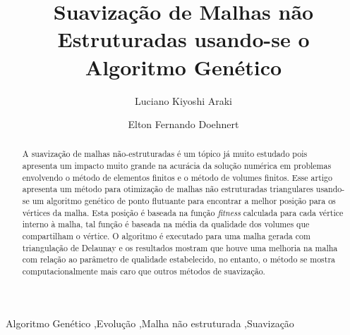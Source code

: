 \documentclass[review]{elsarticle}
\begin{document}
\begin{frontmatter}

\title{Suavização de Malhas não Estruturadas usando-se o Algoritmo Genético}

\author{Luciano Kiyoshi Araki}
\author{Elton Fernando Doehnert}




\begin{abstract}
A suavização de malhas não-estruturadas é um tópico já muito estudado pois apresenta um impacto muito grande na acurácia da solução numérica em problemas envolvendo o método de elementos finitos e o método de volumes finitos. Esse artigo apresenta um método para otimização de malhas não estruturadas triangulares usando-se um algoritmo genético de ponto flutuante para encontrar a melhor posição para os vértices da malha. Esta posição é baseada na função \textit{fitness} calculada para cada vértice interno à malha, tal função é baseada na média da qualidade dos volumes que compartilham o vértice. O algoritmo é executado para uma malha gerada com triangulação de Delaunay e os resultados mostram que houve uma melhoria na malha com relação ao parâmetro de qualidade estabelecido, no entanto, o método se mostra computacionalmente mais caro que outros métodos de suavização.
\end{abstract}

\begin{keyword}
Algoritmo Genético \sep Evolução \sep Malha não estruturada \sep Suavização
\end{keyword}

\end{frontmatter}
\end{document}
